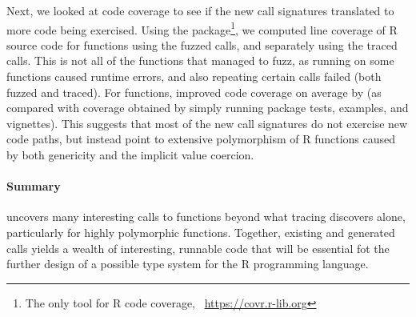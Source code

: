 \documentclass[sigplan,nonacm,anonymous,review]{acmart}
\begin{document}
Next, we looked at code coverage to see if the new call signatures translated to more code being exercised. 
Using the  package\footnote{The only tool for R code coverage, \Cf~\url{https://covr.r-lib.org}}, we computed line coverage of R source code for \UFNumFunctionsWithBothCoverage functions using the fuzzed calls, and separately using the traced calls.
This is not all of the functions that \tool managed to fuzz, as running  on some functions caused runtime errors, and also repeating certain calls failed (both fuzzed and traced).
For \UFBetterCoverage functions, \tool improved code coverage on average by \UFBetterCoverageMean (as compared with coverage obtained by simply running package tests, examples, and vignettes).
This suggests that most of the new call signatures do not exercise new code paths, but instead point to extensive polymorphism of R functions caused by both genericity and the implicit value coercion. 

\paragraph{Summary}

\tool uncovers many interesting calls to functions beyond what tracing discovers alone, particularly for highly polymorphic functions.
Together, existing and generated calls yields a wealth of interesting, runnable code that will be essential fot the further design of a possible type system for the R programming language.

\end{document}
